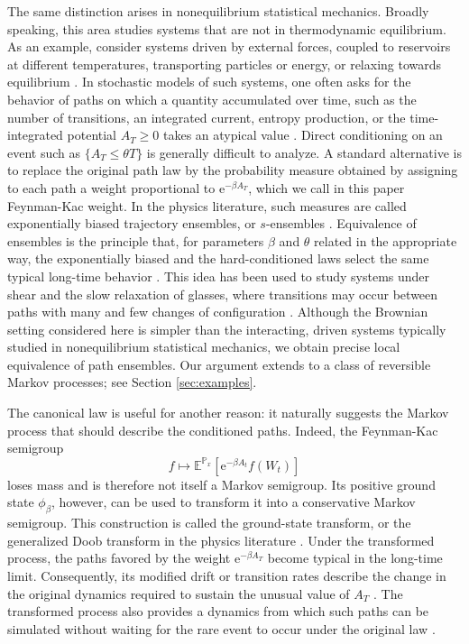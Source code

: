 \documentclass[11pt,reqno]{amsart}
\theoremstyle{definition}
\numberwithin{equation}{section}
\newcommand{\<}{\langle}
\renewcommand{\>}{\rangle}
\def\bbP{{\mathbb{P}}}
\begin{document}
The same distinction arises in nonequilibrium statistical mechanics. Broadly speaking, this area studies systems that are not in thermodynamic equilibrium. As an example, consider systems driven by external forces, coupled to reservoirs at different temperatures, transporting particles or energy, or relaxing towards equilibrium \cite{Zwanzig2001,Jack2020}. In stochastic models of such systems, one often asks for the behavior of paths on which a quantity accumulated over time, such as the number of transitions, an integrated current, entropy production, or the time-integrated potential  $A_T \ge 0 $ takes an atypical value \cite{Touchette2018,Jack2020}.
Direct conditioning on an event such as  $\{ A_T\leq\theta T \} $ is generally difficult to analyze. A standard alternative is to replace the original path law by the probability measure obtained by assigning to each path a weight proportional to  $\mathrm e^{-\beta A_T} $, which we call in this paper Feynman-Kac weight. In the physics literature, such measures are called exponentially biased trajectory ensembles, or  $s $-ensembles \cite{LecomteEtAl2007,JackSollich2010,Touchette2018}. 
Equivalence of ensembles is the principle that, for parameters  $\beta $ and  $\theta $ related in the appropriate way, the exponentially biased and the hard-conditioned laws select the same typical long-time behavior \cite{ChetriteTouchettePRL,ChetriteTouchetteAHP,Touchette2011}. This idea has been used to study systems under shear and the slow relaxation of glasses, where transitions may occur between paths with many and few changes of configuration \cite{GarrahanEtAl2007,HedgesEtAl2009,JackSollich2010}. Although the Brownian setting considered here is simpler than the interacting, driven systems typically studied in nonequilibrium statistical mechanics, we obtain precise local equivalence of path ensembles. Our argument extends to a class of reversible Markov processes; see Section \ref{sec:examples}.

The canonical law is useful for another reason: it naturally suggests the Markov process that should describe the conditioned paths. Indeed, the Feynman-Kac semigroup
\[
    f\longmapsto
    \mathbb{E}^{\bbP_x}\!\left[\mathrm e^{-\beta A_t}f(W_t)\right]
\]
loses mass and is therefore not itself a Markov semigroup. Its positive ground state  $\phi_\beta $, however, can be used to transform it into a conservative Markov semigroup. This construction is called the ground-state transform, or the generalized Doob transform in the physics literature \cite{ChetriteTouchettePRL,Garrahan2016}. Under the transformed process, the paths favored by the weight  $\mathrm e^{-\beta A_T} $ become typical in the long-time limit. Consequently, its modified drift or transition rates describe the change in the original dynamics required to sustain the unusual value of  $A_T $ \cite{JackSollich2010,JackSollich2015}. The transformed process also provides a dynamics from which such paths can be simulated without waiting for the rare event to occur under the original law \cite{CauserEtAl2021}.
\end{document}
